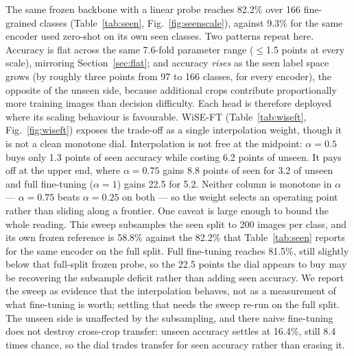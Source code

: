 \documentclass[a4paper,fleqn]{cas-dc}
\begin{document}
The same frozen backbone with a linear probe reaches 82.2\% over 166 fine-grained classes
(Table~\ref{tab:seen}, Fig.~\ref{fig:seenscale}), against 9.3\% for the same encoder used zero-shot on its own seen classes.
Two patterns repeat here. Accuracy is flat across the same 7.6-fold parameter range ($\leq$1.5 points at
every scale), mirroring Section~\ref{sec:flat}; and accuracy \emph{rises} as the seen label space grows
(by roughly three points from 97 to 166 classes, for every encoder), the opposite of the unseen side,
because additional crops contribute proportionally more training images than decision difficulty. Each
head is therefore deployed where its scaling behaviour is favourable. WiSE-FT (Table~\ref{tab:wiseft}, Fig.~\ref{fig:wiseft})
exposes the trade-off as a single interpolation weight, though it is not a clean monotone
dial. Interpolation is not free at the midpoint: $\alpha=0.5$ buys only 1.3 points of seen
accuracy while costing 6.2 points of unseen. It pays off at the upper end, where
$\alpha=0.75$ gains 8.8 points of seen for 3.2 of unseen and full fine-tuning ($\alpha=1$)
gains 22.5 for 5.2. Neither column is monotone in $\alpha$ --- $\alpha=0.75$ beats
$\alpha=0.25$ on both --- so the weight selects an operating point rather than sliding along
a frontier. One caveat is large enough to bound the whole reading. This sweep subsamples the
seen split to 200 images per class, and its own frozen reference is 58.8\% against the
82.2\% that Table~\ref{tab:seen} reports for the same encoder on the full split. Full
fine-tuning reaches 81.5\%, still slightly below that full-split frozen probe, so the 22.5
points the dial appears to buy may be recovering the subsample deficit rather than adding
seen accuracy. We report the sweep as evidence that the interpolation behaves, not as a
measurement of what fine-tuning is worth; settling that needs the sweep re-run on the full
split. The unseen side is unaffected by the subsampling, and there naive fine-tuning does
not destroy cross-crop transfer: unseen accuracy settles at 16.4\%, still 8.4 times chance,
so the dial trades transfer for seen accuracy rather than erasing it.
\end{document}
